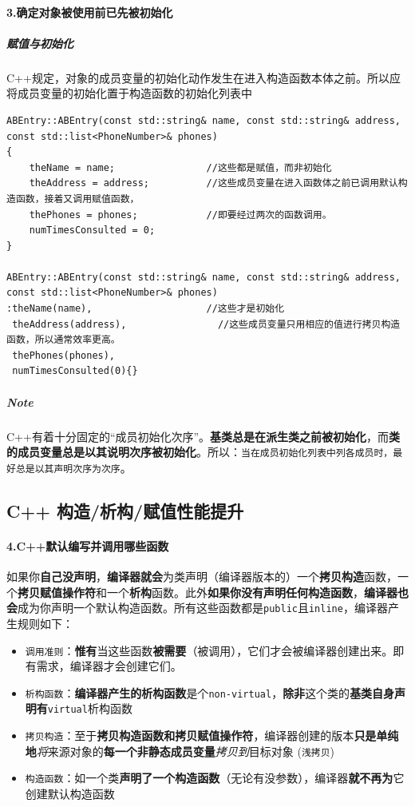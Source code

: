 \documentclass[UTF8,a4paper,12pt]{ctexbook}
\begin{document}
		\paragraph{3.确定对象被使用前已先被初始化}
			\subparagraph{赋值与初始化} C++规定，对象的成员变量的初始化动作发生在进入构造函数本体之前。所以应将成员变量的初始化置于构造函数的初始化列表中
			
			\begin{lstlisting}
ABEntry::ABEntry(const std::string& name, const std::string& address,
const std::list<PhoneNumber>& phones)
{ 
	theName = name;                //这些都是赋值，而非初始化
	theAddress = address;          //这些成员变量在进入函数体之前已调用默认构造函数，接着又调用赋值函数，
	thePhones = phones;            //即要经过两次的函数调用。            
	numTimesConsulted = 0;
} 
	 
ABEntry::ABEntry(const std::string& name, const std::string& address,
const std::list<PhoneNumber>& phones) 
:theName(name),                    //这些才是初始化 
 theAddress(address),                //这些成员变量只用相应的值进行拷贝构造函数，所以通常效率更高。
 thePhones(phones),
 numTimesConsulted(0){} 
			\end{lstlisting}
				
			\subparagraph{Note}  C++有着十分固定的“成员初始化次序”。\textbf{基类总是在派生类之前被初始化}，而\textbf{类的成员变量总是以其说明次序被初始化}。所以：\verb|当在成员初始化列表中列各成员时，最好总是以其声明次序为次序|。
		\subsection{C++ 构造/析构/赋值性能提升}
		\paragraph{4.C++默认编写并调用哪些函数} 如果你\textbf{自己没声明}，\textbf{编译器就会}为类声明（编译器版本的）一个\textbf{拷贝构造}函数，一个\textbf{拷贝赋值操作符}和一个\textbf{析构}函数。此外\textbf{如果你没有声明任何构造函数}，\textbf{编译器也会}成为你声明一个默认构造函数。所有这些函数都是\verb|public|且\verb|inline|，编译器产生规则如下：

			\begin{itemize}
				\item \verb|调用准则|：\textbf{惟有}当这些函数\textbf{被需要}（被调用），它们才会被编译器创建出来。即有需求，编译器才会创建它们。
				\item \verb|析构函数|：\textbf{编译器产生的析构函数}是个\verb|non-virtual|，\textbf{除非}这个类的\textbf{基类自身声明有}\verb|virtual|析构函数
				\item \verb|拷贝构造|：至于\textbf{拷贝构造函数和拷贝赋值操作符}，编译器创建的版本\textbf{只是单纯地}\textit{将}来源对象的\textbf{每一个非静态成员变量}\textit{拷贝到}目标对象 (\verb|浅拷贝|)
				\item \verb|构造函数|：如一个类\textbf{声明了一个构造函数}（无论有没参数），编译器\textbf{就不再为}它创建默认构造函数
			\end{itemize}
				
\end{document}
